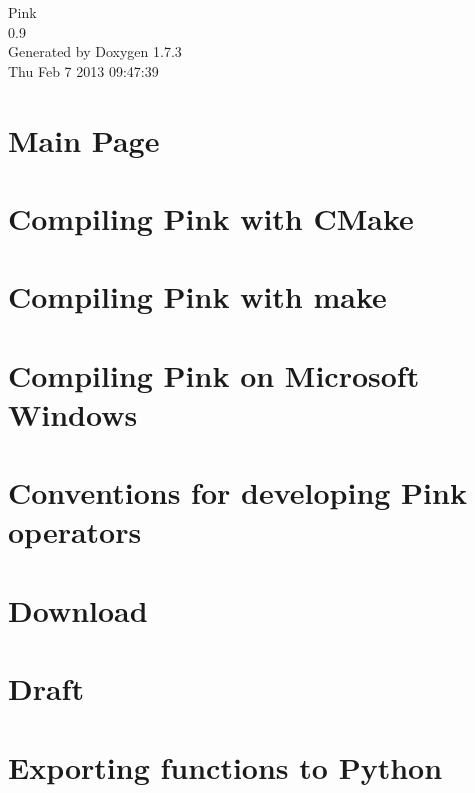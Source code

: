 \documentclass[a4paper]{book}
\begin{document}
\begin{titlepage}
\vspace*{7cm}
\begin{center}
{\Large Pink \\[1ex]\large 0.9 }\\
\vspace*{1cm}
{\large Generated by Doxygen 1.7.3}\\
\vspace*{0.5cm}
{\small Thu Feb 7 2013 09:47:39}\\
\end{center}
\end{titlepage}
\clearemptydoublepage
{}
\tableofcontents
\clearemptydoublepage
{}
\chapter{Main Page}
\label{index}
\chapter{Compiling Pink with CMake}
\label{compiling_cmake}

\chapter{Compiling Pink with make}
\label{compiling_make}

\chapter{Compiling Pink on Microsoft Windows}
\label{compiling_windows}

\chapter{Conventions for developing Pink operators}
\label{dev_conventions}

\chapter{Download}
\label{download}

\chapter{Draft}
\label{files_to_copy}

\chapter{Exporting functions to Python}
\label{python_export}

\end{document}
